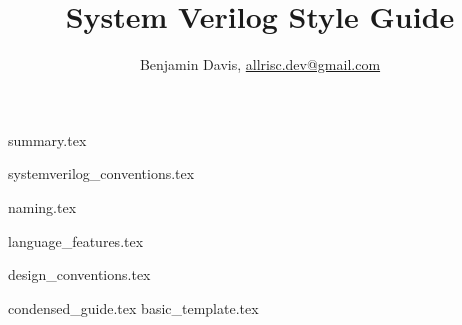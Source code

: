 \documentclass[12pt]{report}
\title{System Verilog Style Guide}
\author{Benjamin Davis, \href{mailto:allrisc.dev@gmail.com}{allrisc.dev@gmail.com}}
\begin{document}
  \pagestyle{title}
  \maketitle

  \pagestyle{plain}
  \tableofcontents

  {summary.tex}

  {systemverilog_conventions.tex}

  {naming.tex}

  {language_features.tex}

  {design_conventions.tex}

  \appendix

  {condensed_guide.tex}
  {basic_template.tex}
\end{document}
